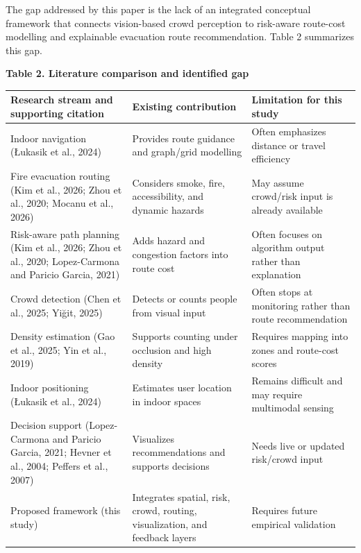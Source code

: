 \documentclass[
]{article}
\newcounter{none} %
\begin{document}
The gap addressed by this paper is the lack of an integrated conceptual
framework that connects vision-based crowd perception to risk-aware
route-cost modelling and explainable evacuation route recommendation.
Table 2 summarizes this gap.

\textbf{Table 2. Literature comparison and identified gap}

{\def\LTcaptype{none} %
\begin{longtable}[]{@{}
  >{\raggedright\arraybackslash}p{}
  >{\raggedright\arraybackslash}p{}
  >{\raggedright\arraybackslash}p{}@{}}
\toprule\noalign{}
\begin{minipage}[b]{\linewidth}\raggedright
Research stream and supporting citation
\end{minipage} & \begin{minipage}[b]{\linewidth}\raggedright
Existing contribution
\end{minipage} & \begin{minipage}[b]{\linewidth}\raggedright
Limitation for this study
\end{minipage} \\
\midrule\noalign{}
\endhead
\bottomrule\noalign{}
\endlastfoot
Indoor navigation (Łukasik et al., 2024) & Provides route guidance and
graph/grid modelling & Often emphasizes distance or travel efficiency \\
Fire evacuation routing (Kim et al., 2026; Zhou et al., 2020; Mocanu et
al., 2026) & Considers smoke, fire, accessibility, and dynamic hazards &
May assume crowd/risk input is already available \\
Risk-aware path planning (Kim et al., 2026; Zhou et al., 2020;
Lopez-Carmona and Paricio Garcia, 2021) & Adds hazard and congestion
factors into route cost & Often focuses on algorithm output rather than
explanation \\
Crowd detection (Chen et al., 2025; Yiğit, 2025) & Detects or counts
people from visual input & Often stops at monitoring rather than route
recommendation \\
Density estimation (Gao et al., 2025; Yin et al., 2019) & Supports
counting under occlusion and high density & Requires mapping into zones
and route-cost scores \\
Indoor positioning (Łukasik et al., 2024) & Estimates user location in
indoor spaces & Remains difficult and may require multimodal sensing \\
Decision support (Lopez-Carmona and Paricio Garcia, 2021; Hevner et al.,
2004; Peffers et al., 2007) & Visualizes recommendations and supports
decisions & Needs live or updated risk/crowd input \\
Proposed framework (this study) & Integrates spatial, risk, crowd,
routing, visualization, and feedback layers & Requires future empirical
validation \\
\end{longtable}
}
\end{document}
